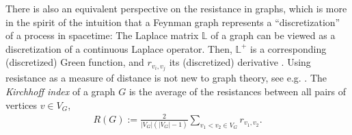 \documentclass[12pt]{article}
\numberwithin{equation}{section}
\newcommand{\abs}[1]{\lvert #1 \rvert}
\begin{document}
There is also an equivalent perspective on the resistance in graphs, which is more in the spirit of the intuition that a Feynman graph represents a \enquote{discretization} of a process in spacetime: The Laplace matrix $\mathbb L$ of a graph can be  viewed as a discretization of a continuous Laplace operator. Then, $\mathbb L^+$ is a corresponding (discretized) Green function, and $r_{v_i,v_j}$ its (discretized) derivative  \cite{kassel_transfer_2015}. Using resistance as a measure of distance is not new to graph theory, see e.g. \cite{klein_resistance_1993,kirkland_distances_1997}. 
The \emph{Kirchhoff index} of a graph $G$ is the average of the resistances between all pairs of vertices $v\in V_G$,
\begin{align}\label{def:kirchhoff_index}
	R(G) := \frac{2}{\abs{V_G} \left( \abs{V_G}-1 \right)  }\sum_{v_1 <v_2 \in V_G} r_{v_1,v_2}.
\end{align}
\end{document}
